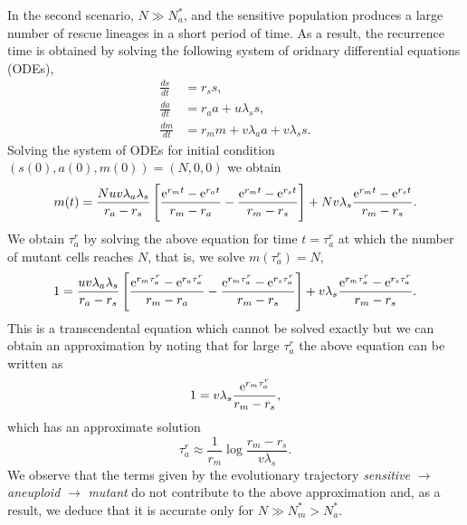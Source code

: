 \documentclass[12pt]{extarticle}
\newcommand{\e}{{\rm e}}
\renewcommand{\Delta}{r}
\begin{document}
\begin{appendices}
In the second scenario, $N\gg N_a^*$, and the sensitive population produces a large number of rescue lineages in a short period of time.
As a result, the recurrence time is obtained by solving the following system of oridnary differential equations (ODEs),
\begin{equation}\label{detODE}
\begin{aligned}
\frac{ds}{dt}&=\Delta_ss,\\
\frac{da}{dt}&=\Delta_aa+u\lambda_ss,\\
\frac{dm}{dt}&=\Delta_mm+v\lambda_aa+v\lambda_ss.
\end{aligned}
\end{equation}
Solving the system of ODEs for initial condition $\left(s(0), a(0), m(0)\right)=\left(N,0,0\right)$ we obtain
\begin{equation*} \label{m_t}
m(t) = \frac{N u v \lambda_a \lambda_s}{\Delta_a - \Delta_s}\left[ \frac{\e^{\Delta_m t} - \e^{\Delta_a t}}{\Delta_m - \Delta_a} - \frac{\e^{\Delta_m t} - \e^{\Delta_s t}}{\Delta_m - \Delta_s} \right] + N v \lambda_s \frac{\e^{\Delta_m t} - \e^{\Delta_s t}}{\Delta_m - \Delta_s}.
\end{equation*}
We obtain $\tau_a^r$ by solving the above equation for time $t=\tau_a^r$ at which the number of mutant cells reaches $N$, that is, we solve $m\left(\tau_a^r\right)=N$,
\begin{equation}\label{eq:t2det2024}
1 = \frac{u v \lambda_a \lambda_s}{\Delta_a - \Delta_s}\left[ \frac{\e^{\Delta_m \tau_a^r} - \e^{\Delta_a \tau_a^r}}{\Delta_m - \Delta_a} - \frac{\e^{\Delta_m \tau_a^r} - \e^{\Delta_s \tau_a^r}}{\Delta_m - \Delta_s} \right] + v \lambda_s \frac{\e^{\Delta_m \tau_a^r} - \e^{\Delta_s \tau_a^r}}{\Delta_m - \Delta_s}.
\end{equation}
This is a transcendental equation which cannot be solved exactly but we can obtain an approximation by noting that for large $\tau_a^r$ the above equation can be written as %
\begin{equation*}
1=v\lambda_s\frac{\e^{\Delta_m\tau_a^r}}{\Delta_m - \Delta_s},
\end{equation*}
which has an approximate solution
\begin{equation}\label{eq:t2det}
\tau_a^r\approx\frac{1}{\Delta_m}\log\frac{\Delta_m-\Delta_s}{v\lambda_s}.
\end{equation}
We observe that the terms given by the evolutionary trajectory \textit{sensitive} $\rightarrow$ \textit{aneuploid} $\rightarrow$ \textit{mutant} do not contribute to the above approximation and, as a result, we deduce that it is accurate only for $N \gg N_m^* > N_a^*$. %


\end{appendices}
\end{document}
